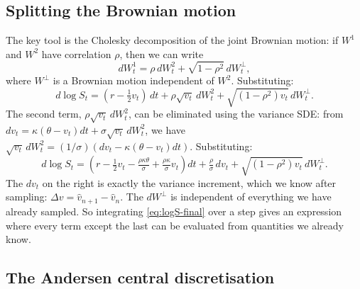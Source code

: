 \documentclass[11pt]{article}
\theoremstyle{plain}
\theoremstyle{definition}
\theoremstyle{remark}
\begin{document}
\subsection{Splitting the Brownian motion}

The key tool is the Cholesky decomposition of the joint Brownian motion: if $W^1$ and $W^2$ have correlation $\rho$, then we can write
\begin{equation}
    dW^1_t = \rho\, dW^2_t + \sqrt{1 - \rho^2}\, dW^\perp_t,                                                    \label{eq:bm-split}
\end{equation}
where $W^\perp$ is a Brownian motion independent of $W^2$. Substituting:
\begin{equation}
    d\log S_t = (r - \tfrac12 v_t)\, dt + \rho\sqrt{v_t}\, dW^2_t + \sqrt{(1-\rho^2) v_t}\, dW^\perp_t.        \label{eq:logS-split}
\end{equation}
The second term, $\rho\sqrt{v_t}\, dW^2_t$, can be eliminated using the variance SDE: from $dv_t = \kappa(\theta - v_t)dt + \sigma\sqrt{v_t}\,dW^2_t$, we have $\sqrt{v_t}\,dW^2_t = (1/\sigma)(dv_t - \kappa(\theta - v_t)dt)$. Substituting:
\begin{equation}
    d\log S_t = \left(r - \tfrac12 v_t - \tfrac{\rho \kappa \theta}{\sigma} + \tfrac{\rho \kappa}{\sigma} v_t\right) dt + \tfrac{\rho}{\sigma}\, dv_t + \sqrt{(1-\rho^2) v_t}\, dW^\perp_t.                                       \label{eq:logS-final}
\end{equation}
The $dv_t$ on the right is exactly the variance increment, which we know after sampling: $\Delta v = \hat v_{n+1} - \hat v_n$. The $dW^\perp$ is independent of everything we have already sampled. So integrating \eqref{eq:logS-final} over a step gives an expression where every term except the last can be evaluated from quantities we already know.

\subsection{The Andersen central discretisation}
\end{document}
